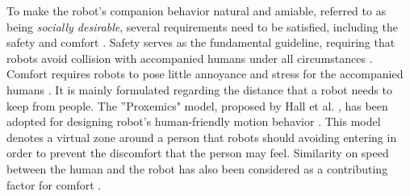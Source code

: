 \documentclass[letterpaper, 10 pt, conference]{ieeeconf}
\newcommand{\todohere}[1]{\hl{(\textbf{TODO:} #1)}}
\begin{document}
	To make the robot's companion behavior natural and amiable, referred to as being \textit{socially desirable}, several requirements need to be satisfied, including the safety and comfort \cite{kruse2013human}.
	Safety serves as the fundamental guideline, requiring that robots avoid collision with accompanied humans under all circumstances \cite{hoeller2007accompanying,fox1997dynamic,svenstrup2010trajectory}.
	Comfort requires robots to pose little annoyance and stress for the accompanied humans \cite{kruse2013human}.
	It is mainly formulated regarding the distance that a robot needs to keep from people.
	The ''Proxemics" model, proposed by Hall et al. \cite{hall1968proxemics}, has been adopted for designing robot's human-friendly motion behavior \cite{barnaud2014proxemics,rios2012navigating}.
	This model denotes a virtual zone around a person that robots should avoiding entering in order to prevent the discomfort that the person may feel.
	Similarity on speed between the human and the robot has also been considered as a contributing factor for comfort \cite{henry2010learning}.
	
	
\end{document}
